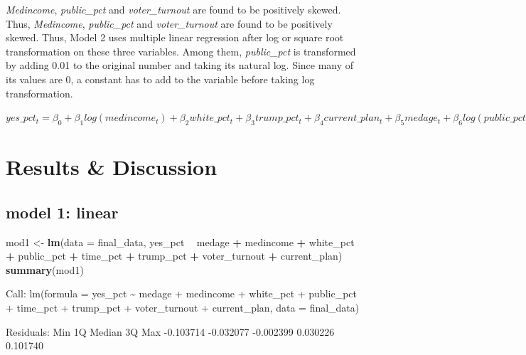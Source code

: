 \documentclass[
]{article}
\newenvironment{Shaded}{\begin{snugshade}}{\end{snugshade}}
\newcommand{\DataTypeTok}[1]{\textcolor[rgb]{0.13,0.29,0.53}{#1}}
\newcommand{\KeywordTok}[1]{\textcolor[rgb]{0.13,0.29,0.53}{\textbf{#1}}}
\newcommand{\NormalTok}[1]{#1}
\newcommand{\OperatorTok}[1]{\textcolor[rgb]{0.81,0.36,0.00}{\textbf{#1}}}
\newcommand{\StringTok}[1]{\textcolor[rgb]{0.31,0.60,0.02}{#1}}
\begin{document}
\emph{Medincome}, \emph{public\_pct} and \emph{voter\_turnout} are found
to be positively skewed. Thus, \emph{Medincome}, \emph{public\_pct} and
\emph{voter\_turnout} are found to be positively skewed. Thus, Model 2
uses multiple linear regression after log or square root transformation
on these three variables. Among them, \emph{public\_pct} is transformed
by adding 0.01 to the original number and taking its natural log. Since
many of its values are 0, a constant has to add to the variable before
taking log transformation.

\(yes\_pct_t = \beta_0+\beta_1log(medincome_t)+\beta_2white\_pct_t+\beta_3trump\_pct_t+\beta_4current\_plan_t+\beta_5medage_t+\beta_6log(public\_pct_t + 0.01)+\beta_7time\_pct_t+\beta_8\sqrt{voter\_turnout_t}+\epsilon_t\)

\hypertarget{results-discussion}{%
\section{Results \& Discussion}\label{results-discussion}}

\hypertarget{model-1-linear}{%
\subsection{model 1: linear}\label{model-1-linear}}

\begin{Shaded}
\begin{Highlighting}[]
\NormalTok{mod1 <-}\StringTok{ }\KeywordTok{lm}\NormalTok{(}\DataTypeTok{data =}\NormalTok{ final_data, yes_pct }\OperatorTok{~}\StringTok{ }\NormalTok{medage }\OperatorTok{+}\StringTok{ }\NormalTok{medincome }\OperatorTok{+}\StringTok{ }\NormalTok{white_pct }
           \OperatorTok{+}\StringTok{ }\NormalTok{public_pct }\OperatorTok{+}\StringTok{ }\NormalTok{time_pct }\OperatorTok{+}\StringTok{ }\NormalTok{trump_pct }\OperatorTok{+}\StringTok{ }\NormalTok{voter_turnout }\OperatorTok{+}
\StringTok{              }\NormalTok{current_plan)}
\KeywordTok{summary}\NormalTok{(mod1)}
\end{Highlighting}
\end{Shaded}

Call: lm(formula = yes\_pct \textasciitilde{} medage + medincome +
white\_pct + public\_pct + time\_pct + trump\_pct + voter\_turnout +
current\_plan, data = final\_data)

Residuals: Min 1Q Median 3Q Max -0.103714 -0.032077 -0.002399 0.030226
0.101740
\end{document}
